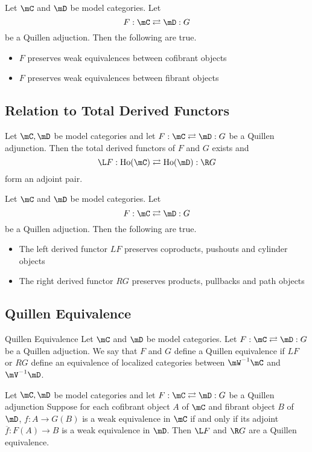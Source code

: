 \documentclass[a4paper]{article}
\begin{document}
\begin{prp}{}{} Let $\mC$ and $\mD$ be model categories. Let $$F:\mC\rightleftarrows\mD:G$$ be a Quillen adjuction. Then the following are true. 
\begin{itemize}
\item $F$ preserves weak equivalences between cofibrant objects
\item $F$ preserves weak equivalences between fibrant objects
\end{itemize}
\end{prp}

\subsection{Relation to Total Derived Functors}
\begin{thm}{}{} Let $\mC,\mD$ be model categories and let $F:\mC\rightleftarrows\mD:G$ be a Quillen adjunction. Then the total derived functors of $F$ and $G$ exists and $$\L F:\text{Ho}(\mC)\rightleftarrows\text{Ho}(\mD):\R G$$ form an adjoint pair. 
\end{thm}

\begin{prp}{}{} Let $\mC$ and $\mD$ be model categories. Let $$F:\mC\rightleftarrows\mD:G$$ be a Quillen adjuction. Then the following are true. 
\begin{itemize}
\item The left derived functor $LF$ preserves coproducts, pushouts and cylinder objects
\item The right derived functor $RG$ preserves products, pullbacks and path objects
\end{itemize}
\end{prp}

\subsection{Quillen Equivalence}
\begin{defn}{Quillen Equivalence}{} Let $\mC$ and $\mD$ be model categories. Let $F:\mC\rightleftarrows\mD:G$ be a Quillen adjuction. We say that $F$ and $G$ define a Quillen equivalence if $LF$ or $RG$ define an equivalence of localized categories between $\mW^{-1}\mC$ and $\mV^{-1}\mD$. 
\end{defn}

\begin{thm}{}{} Let $\mC,\mD$ be model categories and let $F:\mC\rightleftarrows\mD:G$ be a Quillen adjunction Suppose for each cofibrant object $A$ of $\mC$ and fibrant object $B$ of $\mD$, $f:A\to G(B)$ is a weak equivalence in $\mC$ if and only if its adjoint $\overline{f}:F(A)\to B$ is a weak equivalence in $\mD$. Then $\L F$ and $\R G$ are a Quillen equivalence. 
\end{thm}
\end{document}
